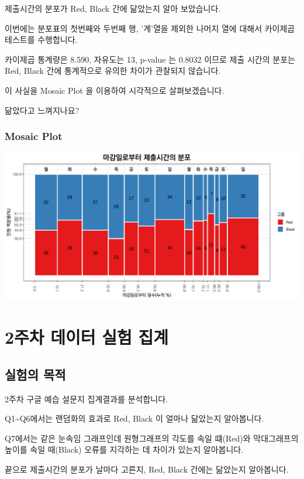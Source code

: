 \documentclass[
]{book}
\begin{document}
제출시간의 분포가 Red, Black 간에 닮았는지 알아 보았습니다.

이번에는 분포표의 첫번째와 두번째 행, '계'열을 제외한 나머지 열에 대해서 카이제곱테스트를 수행합니다.

카이제곱 통계량은 8.590, 자유도는 13, p-value 는 0.8032 이므로 제출 시간의 분포는 Red, Black 간에 통계적으로 유의한 차이가 관찰되지 않습니다.

이 사실을 Mosaic Plot 을 이용하여 시각적으로 살펴보겠습니다.

닮았다고 느껴지나요?

\subsection{Mosaic Plot}\label{mosaic-plot-1}

\includegraphics{_main_files/figure-latex/unnamed-chunk-32-1.pdf}

\chapter{2주차 데이터 실험 집계}\label{uxc8fcuxcc28-uxb370uxc774uxd130-uxc2e4uxd5d8-uxc9d1uxacc4-1}

\section{실험의 목적}\label{uxc2e4uxd5d8uxc758-uxbaa9uxc801-1}

2주차 구글 예습 설문지 집계결과를 분석합니다.

Q1\textasciitilde Q6에서는 랜덤화의 효과로 Red, Black 이 얼마나 닮았는지 알아봅니다.

Q7에서는 같은 눈속임 그래프인데 원형그래프의 각도를 속일 떄(Red)와 막대그래프의 높이를 속일 때(Black) 오류를 지각하는 데 차이가 있는지 알아봅니다.

끝으로 제출시간의 분포가 날마다 고른지, Red, Black 간에는 닮았는지 알아봅니다.
\end{document}
